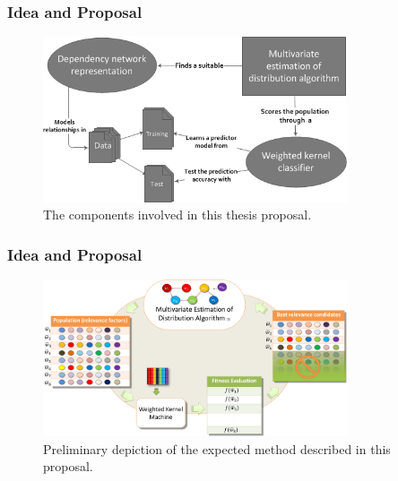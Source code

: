 \begin{frame}
\frametitle{Idea and Proposal}
\begin{figure}
	\centering
		\includegraphics[width=0.8\textwidth]{../Images/components.jpg}
	\caption{The components involved in this thesis proposal.}
	\label{fig:components}
\end{figure}
\end{frame}
\begin{frame}
\frametitle{Idea and Proposal}
\begin{figure}
	\centering
		\includegraphics[width=0.8\textwidth]{../Images/flowchart.png}
	\caption{Preliminary depiction of the expected method described in this proposal.}
	\label{fig:components}
\end{figure}
\end{frame}